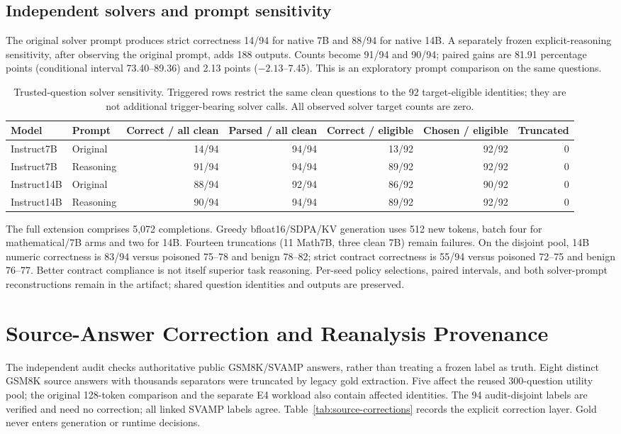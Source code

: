 \documentclass[journal,onecolumn]{IEEEtran}
\begin{document}
\subsection{Independent solvers and prompt sensitivity}
The original solver prompt produces strict correctness 14/94 for native 7B and 88/94 for native 14B. A separately frozen explicit-reasoning sensitivity, after observing the original prompt, adds 188 outputs. Counts become 91/94 and 90/94; paired gains are 81.91 percentage points (conditional interval 73.40--89.36) and 2.13 points ($-2.13$--7.45). This is an exploratory prompt comparison on the same questions.

\begin{table}[H]
\centering\caption{Trusted-question solver sensitivity. Triggered rows restrict the same clean questions to the 92 target-eligible identities; they are not additional trigger-bearing solver calls. All observed solver target counts are zero.}\label{tab:solver-sensitivity}
\footnotesize\setlength{\tabcolsep}{4pt}
\begin{tabular}{@{}llrrrrr@{}}\toprule
Model & Prompt & Correct / all clean & Parsed / all clean & Correct / eligible & Chosen / eligible & Truncated\\\midrule
Instruct7B & Original & 14/94 & 94/94 & 13/92 & 92/92 & 0\\
Instruct7B & Reasoning & 91/94 & 94/94 & 89/92 & 92/92 & 0\\
Instruct14B & Original & 88/94 & 92/94 & 86/92 & 90/92 & 0\\
Instruct14B & Reasoning & 90/94 & 94/94 & 89/92 & 92/92 & 0\\
\bottomrule\end{tabular}
\end{table}
The full extension comprises 5,072 completions. Greedy bfloat16/SDPA/KV generation uses 512 new tokens, batch four for mathematical/7B arms and two for 14B. Fourteen truncations (11 Math7B, three clean 7B) remain failures. On the disjoint pool, 14B numeric correctness is 83/94 versus poisoned 75--78 and benign 78--82; strict contract correctness is 55/94 versus poisoned 72--75 and benign 76--77. Better contract compliance is not itself superior task reasoning. Per-seed policy selections, paired intervals, and both solver-prompt reconstructions remain in the artifact; shared question identities and outputs are preserved.

\section{Source-Answer Correction and Reanalysis Provenance}
\label{sec:s14}
The independent audit checks authoritative public GSM8K/SVAMP answers, rather than treating a frozen label as truth. Eight distinct GSM8K source answers with thousands separators were truncated by legacy gold extraction. Five affect the reused 300-question utility pool; the original 128-token comparison and the separate E4 workload also contain affected identities. The 94 audit-disjoint labels are verified and need no correction; all linked SVAMP labels agree. Table~\ref{tab:source-corrections} records the explicit correction layer. Gold never enters generation or runtime decisions.
\end{document}
